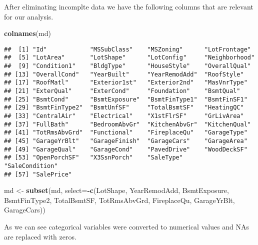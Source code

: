 \documentclass[]{article}
\newenvironment{Shaded}{\begin{snugshade}}{\end{snugshade}}
\newcommand{\DataTypeTok}[1]{\textcolor[rgb]{0.13,0.29,0.53}{#1}}
\newcommand{\KeywordTok}[1]{\textcolor[rgb]{0.13,0.29,0.53}{\textbf{#1}}}
\newcommand{\NormalTok}[1]{#1}
\newcommand{\OperatorTok}[1]{\textcolor[rgb]{0.81,0.36,0.00}{\textbf{#1}}}
\newcommand{\StringTok}[1]{\textcolor[rgb]{0.31,0.60,0.02}{#1}}
\begin{document}
After eliminating incomplte data we have the following columns that are
relevant for our analysis.

\begin{Shaded}
\begin{Highlighting}[]
\KeywordTok{colnames}\NormalTok{(md)}
\end{Highlighting}
\end{Shaded}

\begin{verbatim}
##  [1] "Id"            "MSSubClass"    "MSZoning"      "LotFrontage"  
##  [5] "LotArea"       "LotShape"      "LotConfig"     "Neighborhood" 
##  [9] "Condition1"    "BldgType"      "HouseStyle"    "OverallQual"  
## [13] "OverallCond"   "YearBuilt"     "YearRemodAdd"  "RoofStyle"    
## [17] "RoofMatl"      "Exterior1st"   "Exterior2nd"   "MasVnrType"   
## [21] "ExterQual"     "ExterCond"     "Foundation"    "BsmtQual"     
## [25] "BsmtCond"      "BsmtExposure"  "BsmtFinType1"  "BsmtFinSF1"   
## [29] "BsmtFinType2"  "BsmtUnfSF"     "TotalBsmtSF"   "HeatingQC"    
## [33] "CentralAir"    "Electrical"    "X1stFlrSF"     "GrLivArea"    
## [37] "FullBath"      "BedroomAbvGr"  "KitchenAbvGr"  "KitchenQual"  
## [41] "TotRmsAbvGrd"  "Functional"    "FireplaceQu"   "GarageType"   
## [45] "GarageYrBlt"   "GarageFinish"  "GarageCars"    "GarageArea"   
## [49] "GarageQual"    "GarageCond"    "PavedDrive"    "WoodDeckSF"   
## [53] "OpenPorchSF"   "X3SsnPorch"    "SaleType"      "SaleCondition"
## [57] "SalePrice"
\end{verbatim}

\begin{Shaded}
\begin{Highlighting}[]
\NormalTok{md <-}\StringTok{ }\KeywordTok{subset}\NormalTok{(md, }\DataTypeTok{select=}\OperatorTok{-}\KeywordTok{c}\NormalTok{(LotShape, YearRemodAdd, BsmtExposure, }
\NormalTok{                           BsmtFinType2, TotalBsmtSF, TotRmsAbvGrd, }
\NormalTok{                           FireplaceQu, GarageYrBlt, GarageCars))}
\end{Highlighting}
\end{Shaded}

As we can see categorical variables were converted to numerical values
and NAs are replaced with zeros.
\end{document}

